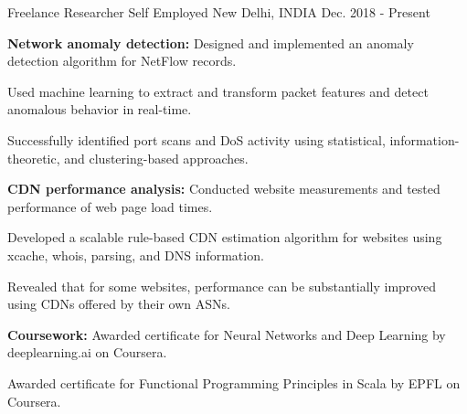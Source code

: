 \begin{cventries}
  \cventry
    {Freelance Researcher} %
    {Self Employed} %
    {New Delhi, INDIA} %
    {Dec. 2018 - Present} %
    {
      \begin{cvitems} %
      \item {\textbf{Network anomaly detection:} Designed and implemented an anomaly detection algorithm for NetFlow records.
      		}
      \item {Used machine learning to extract and transform packet features and detect anomalous behavior in real-time.}
      \item {Successfully identified port scans and DoS activity using statistical, information-theoretic, and clustering-based approaches.}
%      
      \item {\textbf{CDN performance analysis:} Conducted website measurements and tested performance of web page load times.
      		}
      \item {Developed a scalable rule-based CDN estimation algorithm for websites using xcache, whois, parsing, and DNS information.}
      \item {Revealed that for some websites, performance can be substantially improved using CDNs offered by their own ASNs.}
%      
      \item {\textbf{Coursework:} Awarded certificate for Neural Networks and Deep Learning by deeplearning.ai on Coursera.
      		}
      \item {Awarded certificate for Functional Programming Principles in Scala by  EPFL on Coursera.
      		}
      \end{cvitems}
    }


\end{cventries}
